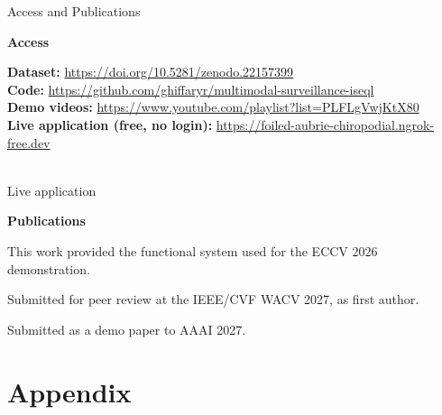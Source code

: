 \documentclass[aspectratio=169,10pt]{beamer}
\begin{document}
\begin{frame}{Access and Publications}
\centering
\vspace{0.5\baselineskip}
\noindent\begin{minipage}{\textwidth}
{\small\bfseries\color{navy}Access}\par
\vspace{0.3\baselineskip}
\begin{minipage}[c]{0.70\textwidth}
\raggedright\setlength{\leftskip}{0pt}\setlength{\parindent}{0pt}\footnotesize\noindent
  \textbf{Dataset:} \url{https://doi.org/10.5281/zenodo.22157399}\\[0.4em]
  \textbf{Code:} \url{https://github.com/ghiffaryr/multimodal-surveillance-iseql}\\[0.4em]
  \textbf{Demo videos:} \url{https://www.youtube.com/playlist?list=PLFLgVwjKtX80}\\[0.4em]
  \textbf{Live application (free, no login):} \url{https://foiled-aubrie-chiropodial.ngrok-free.dev}
\end{minipage}%
\hspace{0.4cm}%
\begin{minipage}[c]{2.3cm}
\centering
{}\\[0.25em]
{\scriptsize Live application}
\end{minipage}

\vspace{0.9\baselineskip}
{\small\bfseries\color{navy}Publications}\par
\vspace{0.3\baselineskip}
{\raggedright\footnotesize\setlength{\parskip}{0.5em}\setlength{\parindent}{0pt}\noindent
  This work provided the functional system used for the ECCV 2026 demonstration.\par
  Submitted for peer review at the IEEE/CVF WACV 2027, as first author.\par
  Submitted as a demo paper to AAAI 2027.\par
}
\end{minipage}
\end{frame}

\appendix
\section*{Appendix}
\end{document}
